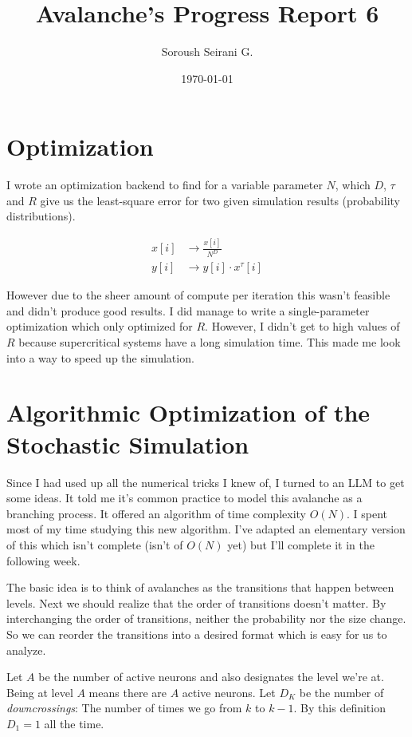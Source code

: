 \documentclass{article}
\author{Soroush Seirani G.}
\date{\today}
\title{Avalanche's Progress Report 6}
\begin{document}
\maketitle
\section{Optimization}
\label{sec:org645a572}
I wrote an optimization backend to find for a variable parameter \(N\),
which \(D\), \(\tau\) and \(R\) give us the least-square error for two given
simulation results (probability distributions).

\begin{align}
  x[i] &\longrightarrow \frac{x[i]}{N^D}\\
  y[i] &\longrightarrow y[i] \cdot x^{\tau}[i]
\end{align}

However due to the sheer amount of compute per iteration this wasn't
feasible and didn't produce good results. I did manage to write a
single-parameter optimization which only optimized for \(R\). However, I
didn't get to high values of \(R\) because supercritical systems have a
long simulation time. This made me look into a way to speed up the
simulation.
\section{Algorithmic Optimization of the Stochastic Simulation}
\label{sec:org58d5535}
Since I had used up all the numerical tricks I knew of, I turned to an
LLM to get some ideas. It told me it's common practice to model this
avalanche as a branching process. It offered an algorithm of time
complexity \(O(N)\). I spent most of my time studying this new
algorithm. I've adapted an elementary version of this which isn't
complete (isn't of \(O(N)\) yet) but I'll complete it in the following
week.

The basic idea is to think of avalanches as the transitions that
happen between levels. Next we should realize that the order of
transitions doesn't matter. By interchanging the order of transitions,
neither the probability nor the size change. So we can reorder the
transitions into a desired format which is easy for us to analyze.

Let \(A\) be the number of active neurons and also designates the level
we're at. Being at level \(A\) means there are \(A\) active neurons. Let
\(D_K\) be the number of \emph{downcrossings}: The number of times we go from
\(k\) to \(k-1\). By this definition \(D_1 = 1\) all the time.
\end{document}
